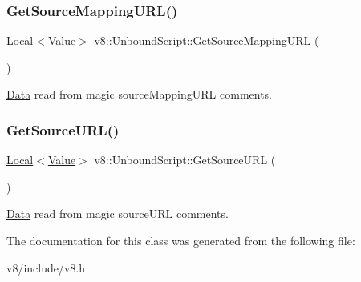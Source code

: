 \subsubsection{\texorpdfstring{Get\+Source\+Mapping\+U\+R\+L()}{GetSourceMappingURL()}}
{\footnotesize\ttfamily \mbox{\hyperlink{classv8_1_1Local}{Local}}$<$\mbox{\hyperlink{classv8_1_1Value}{Value}}$>$ v8\+::\+Unbound\+Script\+::\+Get\+Source\+Mapping\+U\+RL (\begin{DoxyParamCaption}{ }\end{DoxyParamCaption})}

\mbox{\hyperlink{classv8_1_1Data}{Data}} read from magic source\+Mapping\+U\+RL comments. \mbox{\label{classv8_1_1UnboundScript_a08744c609e72aaf2899a708efd53249f}} 
\subsubsection{\texorpdfstring{Get\+Source\+U\+R\+L()}{GetSourceURL()}}
{\footnotesize\ttfamily \mbox{\hyperlink{classv8_1_1Local}{Local}}$<$\mbox{\hyperlink{classv8_1_1Value}{Value}}$>$ v8\+::\+Unbound\+Script\+::\+Get\+Source\+U\+RL (\begin{DoxyParamCaption}{ }\end{DoxyParamCaption})}

\mbox{\hyperlink{classv8_1_1Data}{Data}} read from magic source\+U\+RL comments. 

The documentation for this class was generated from the following file\+:\begin{DoxyCompactItemize}
\item 
v8/include/v8.\+h\end{DoxyCompactItemize}
